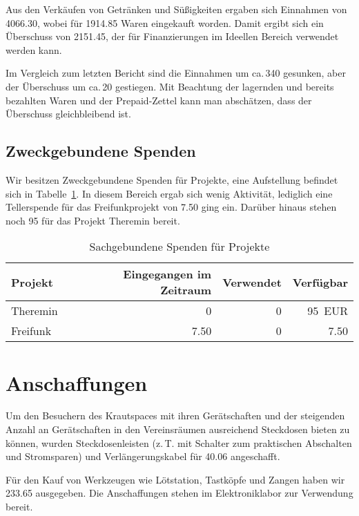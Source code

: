 \documentclass[ngerman]{scrartcl}
\begin{document}
Aus den Verkäufen  von Getränken und Süßigkeiten ergaben sich Einnahmen von \SI{4066,30}{\EUR}, wobei für \SI{1914,85}{\EUR} Waren eingekauft worden.
Damit ergibt sich ein Überschuss von \SI{2151,45}{\EUR}, der für Finanzierungen im Ideellen Bereich verwendet werden kann.

Im Vergleich zum letzten Bericht sind die Einnahmen um ca.\,\SI{340}{\EUR} gesunken, aber der Überschuss um ca.\,\SI{20}{\EUR} gestiegen.
Mit Beachtung der lagernden und bereits bezahlten Waren und der Prepaid-Zettel kann man abschätzen, dass der Überschuss gleichbleibend ist.

\subsection{Zweckgebundene Spenden}
\label{sec:zweckgebundene_spenden}

Wir besitzen Zweckgebundene Spenden für Projekte, eine Aufstellung befindet sich in Tabelle~\ref{table:spenden}.
In diesem Bereich ergab sich wenig Aktivität, lediglich eine Tellerspende für das Freifunkprojekt von \SI{7,50}{\EUR} ging ein. Darüber hinaus stehen noch \SI{95}{\EUR} für das Projekt Theremin bereit.

\begin{table}[h]
	\centering
	\begin{tabular}{l|r|r|r}
          \toprule
	\textbf{Projekt} & \textbf{Eingegangen im Zeitraum} & \textbf{Verwendet} & \textbf{Verfügbar} \\ \midrule
	Theremin & \SI{0}{\EUR} & \SI{0}{\EUR} & \SI{95}{EUR} \\
	Freifunk & \SI{7,50}{\EUR} & \SI{0}{\EUR} & \SI{7,50}{\EUR} \\
	\end{tabular}
	\caption{Sachgebundene Spenden für Projekte}
	\label{table:spenden}
\end{table}

\section{Anschaffungen}
\label{sec:anschaffungen}
Um den Besuchern des Krautspaces mit ihren Gerätschaften und der steigenden Anzahl an Gerätschaften in den Vereinsräumen ausreichend Steckdosen bieten zu können, wurden Steckdosenleisten (z.\,T. mit Schalter zum praktischen Abschalten und Stromsparen) und Verlängerungskabel für \SI{40,06}{\EUR} angeschafft.

Für den Kauf von Werkzeugen wie Lötstation, Tastköpfe und Zangen haben wir \SI{233,65}{\EUR} ausgegeben.
Die Anschaffungen stehen im Elektroniklabor zur Verwendung bereit.
\end{document}
